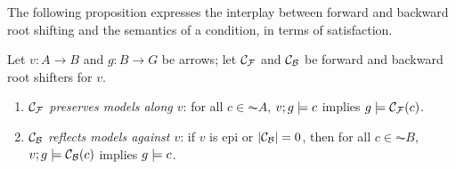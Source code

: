 The following proposition expresses the interplay between forward and backward root shifting and the semantics of a condition, in terms of satisfaction.

\begin{proposition}
Let $v:A\to B$ and $g:B\to G$ be arrows; let $\mathcal{C}_{\mathcal{F}}$ and $\mathcal{C}_{\mathcal{B}}$ be forward and backward root shifters for $v$.
\begin{enumerate}
\item \emph{$\mathcal{C}_{\mathcal{F}}$ preserves models along $v$}: for all $c\in\AC A$, $v;g\models c$ implies $g\models \mathcal{C}_{\mathcal{F}}(c)$.
\item \emph{$\mathcal{C}_{\mathcal{B}}$ reflects models against $v$}: if $v$ is epi or $|\mathcal{C}_{\mathcal{B}}|=0$, then for all $c\in\AC B$, $v;g\models \mathcal{C}_{\mathcal{B}}(c)$ implies $g\models c$.
\end{enumerate}
\end{proposition}
%

